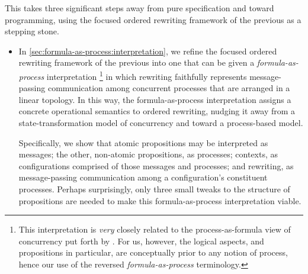 This  takes three significant steps away from pure specification and toward programming, using the focused ordered rewriting framework of the previous  as a stepping stone.
\begin{itemize}[listparindent=\parindent, itemsep=\dimexpr\itemsep+\parsep\relax, parsep=0pt]
\item
  In \cref{sec:formula-as-process:interpretation}, we refine the focused ordered rewriting framework of the previous  into one that can be given a \emph{formula-as-process} interpretation%
  \footnote[][-3.1\baselineskip]{This interpretation is \emph{very} closely related to the process-as-formula view of concurrency put forth by \textcites{Miller:ELP92}{Cervesato+Scedrov:IC09}.
    For us, however, the logical aspects, and propositions in particular, are conceptually prior to any notion of process, hence our use of the reversed \emph{formula-as-process} terminology.}
  in which rewriting faithfully represents message-passing communication among concurrent processes that are arranged in a linear topology.
  In this way, the formula-as-process interpretation assigns a concrete operational semantics to ordered rewriting, nudging it away from a state-transformation model of concurrency and toward a process-based model.

  Specifically, we show that atomic propositions may be interpreted as messages;
  the other, non-atomic propositions, as processes;
  contexts, as configurations comprised of those messages and processes;
  and
  rewriting, as mes\-sage-passing communication among a configuration's con\-stit\-u\-ent processes.
  Perhaps surprisingly, only three small tweaks to the structure of propositions are needed to make this formula-as-process interpretation viable.




\end{itemize}
